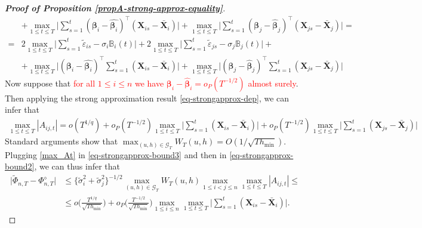 \documentclass[a4paper,12pt]{article}
\begin{document}
\begin{proof}[\textnormal{\textbf{Proof of Proposition \ref{propA-strong-approx-equality}}}]
\begin{align*}
& + \max_{1 \le t \le T} \Big|\sum\limits_{s=1}^t(\bm{\beta}_i - \widehat{\bm{\beta}_i})^\top (\mathbf{X}_{is} - \bar{\mathbf{X}}_{i}) \Big| 
+ \max_{1 \le t \le T} \Big|\sum\limits_{s=1}^t(\bm{\beta}_j - \widehat{\bm{\beta}}_j)^\top (\mathbf{X}_{js} - \bar{\mathbf{X}}_{j}) \Big| =\\
= & 2 \max_{1 \le t \le T} \Big| \sum\limits_{s=1}^t \widetilde{\varepsilon}_{is} - \sigma_i \mathbb{B}_{i}(t) \Big| + 2 \max_{1 \le t \le T} \Big| \sum\limits_{s=1}^t \widetilde{\varepsilon}_{js} - \sigma_j \mathbb{B}_{j}(t) \Big| +\\
& + \max_{1 \le t \le T} \Big|(\bm{\beta}_i - \widehat{\bm{\beta}_i})^\top\sum\limits_{s=1}^t (\mathbf{X}_{is} - \bar{\mathbf{X}}_{i}) \Big| 
+ \max_{1 \le t \le T} \Big|(\bm{\beta}_j - \widehat{\bm{\beta}}_j)^\top\sum\limits_{s=1}^t (\mathbf{X}_{js} - \bar{\mathbf{X}}_{j}) \Big|
\end{align*}
Now suppose that \textcolor{red}{for all $1 \le i \le n$ we have $\bm{\beta}_i - \widehat{\bm{\beta}}_i = o_P(T^{-1/2})$ almost surely}. Then applying the strong approximation result \eqref{eq-strongapprox-dep}, we can infer that
\begin{align}\label{max_At}
\max_{1 \le t \le T} |A_{ij, t}|  = o(T^{1/q}) + o_P(T^{-1/2})\max_{1 \le t \le T}\Big|\sum\limits_{s=1}^t (\mathbf{X}_{is} - \bar{\mathbf{X}}_{i})\Big| +  o_P(T^{-1/2})\max_{1 \le t \le T}\Big|\sum\limits_{s=1}^t (\mathbf{X}_{js} - \bar{\mathbf{X}}_{j} )\Big|
\end{align}
Standard arguments show that $\max_{(u,h) \in \mathcal{G}_T} W_T(u,h) = O( 1/\sqrt{Th_{\min}} )$. Plugging \eqref{max_At} in \eqref{eq-strongapprox-bound3} and then in \eqref{eq-strongapprox-bound2}, we can thus infer that 
\begin{align}\label{eq-strongapprox-bound4}
\big| \widetilde{\Phi}_{n, T} - \Phi_{n, T}^{\diamond} \big| &\le \{\widetilde{\sigma}_i^2 + \widetilde{\sigma}_j^2 \}^{-1/2}  \max_{(u,h) \in \mathcal{G}_T} W_T(u, h) \max_{1\le i < j \le n}\max_{1\le t \le T} |A_{ij, t}|\le\nonumber \\
&\le o\Big( \frac{T^{1/q}}{\sqrt{Th_{\min}}} \Big) + o_P \Big( \frac{T^{-1/2}}{\sqrt{Th_{\min}}} \Big)\max_{1 \le i \le n}\max_{1\le t \le T}\Big|\sum\limits_{s=1}^t (\mathbf{X}_{is} - \bar{\mathbf{X}}_{i} )\Big|.
\end{align}


\end{proof}
\end{document}

